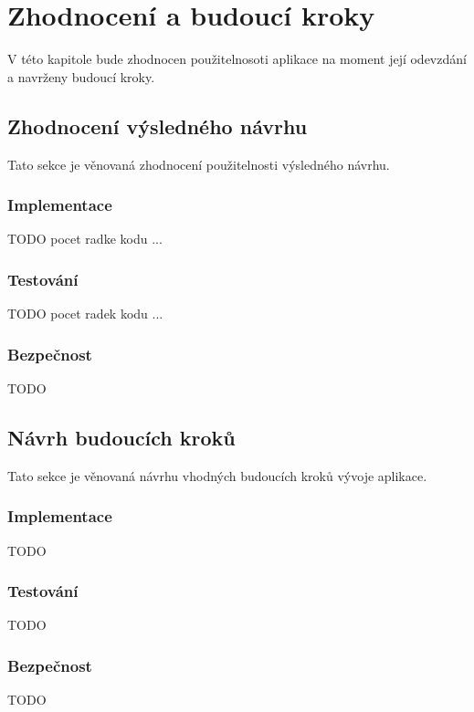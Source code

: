 \chapter{Zhodnocení a budoucí kroky}
V této kapitole bude zhodnocen použitelnosoti aplikace na moment její odevzdání a navrženy budoucí kroky.
\section{Zhodnocení výsledného návrhu}
    Tato sekce je věnovaná zhodnocení použitelnosti výsledného návrhu. 
    \subsection{Implementace}
        TODO pocet radke kodu ...
    \subsection{Testování}
        TODO pocet radek kodu ...
    \subsection{Bezpečnost}
        TODO

\section{Návrh budoucích kroků}
    Tato sekce je věnovaná návrhu vhodných budoucích kroků vývoje aplikace.
    \subsection{Implementace}
        TODO
    \subsection{Testování}
        TODO
    \subsection{Bezpečnost}
        TODO
